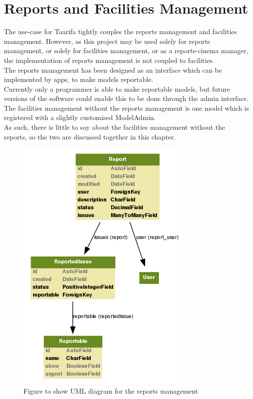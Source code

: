 \chapter{Reports and Facilities Management}
\label{sec:rm}

The use-case for Taarifa tightly couples the reports management and facilities management. However, as this project may be used solely for reports management, or solely for facilities management, or as a reports-cinema manager, the implementation of reports management is not coupled to facilities. \\

The reports management has been designed as an interface which can be implemented by apps, to make models reportable. \\

Currently only a programmer is able to make reportable models, but future versions of the software could enable this to be done through the admin interface. \\

The facilities management without the reports management is one model which is registered with a slightly customised ModelAdmin. \\

As such, there is little to say about the facilities management without the reports, so the two are discussed together in this chapter.

\begin{figure}
\centering
\includegraphics[scale=0.51]{img/reports.png}
\caption{Figure to show UML diagram for the reports management}
\label{fig:rm:uml}
\end{figure}

